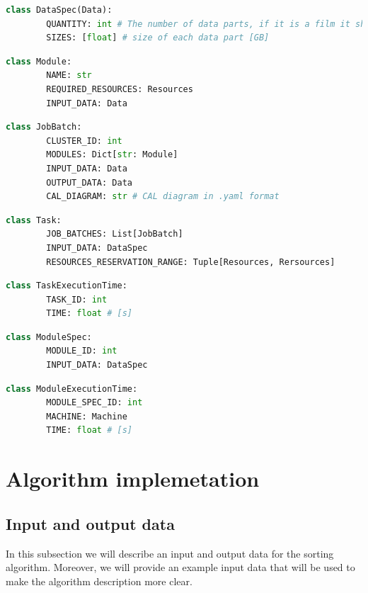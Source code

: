 \documentclass{article}
\begin{document}
	\begin{lstlisting}[language=Python]
	class DataSpec(Data):
		QUANTITY: int # The number of data parts, if it is a film it should be 1, if it is a set of photos, it should be the number of photos
		SIZES: [float] # size of each data part [GB]
	\end{lstlisting}
	
	\begin{lstlisting}[language=Python,label={lst:Module}, caption=Module data structure]
	class Module:
		NAME: str
		REQUIRED_RESOURCES: Resources
		INPUT_DATA: Data
	\end{lstlisting}
	
	\begin{lstlisting}[language=Python]
	class JobBatch:
		CLUSTER_ID: int
		MODULES: Dict[str: Module]
		INPUT_DATA: Data
		OUTPUT_DATA: Data
		CAL_DIAGRAM: str # CAL diagram in .yaml format
	\end{lstlisting}
	
	\begin{lstlisting}[language=Python]
	class Task:
		JOB_BATCHES: List[JobBatch]
		INPUT_DATA: DataSpec
		RESOURCES_RESERVATION_RANGE: Tuple[Resources, Rersources]
	\end{lstlisting}
	
	\begin{lstlisting}[language=Python,label={lst:TaskExecution}, caption=TaskExecution data structure]
	class TaskExecutionTime:
		TASK_ID: int
		TIME: float # [s]
	\end{lstlisting}
	
	\begin{lstlisting}[language=Python,label={lst:ModuleSpec}, caption=ModuleSpec data structure]
	class ModuleSpec:
		MODULE_ID: int
		INPUT_DATA: DataSpec
	\end{lstlisting}
	
	\begin{lstlisting}[language=Python,label={lst:ModuleExecutionTime}, caption=ModuleExecutionTime data structure]
	class ModuleExecutionTime:
		MODULE_SPEC_ID: int
		MACHINE: Machine
		TIME: float # [s]
	\end{lstlisting}
	
	\section{Algorithm implemetation}
	\subsection{Input and output data}
	In this subsection we will describe an input and output data for the sorting algorithm. Moreover, we will provide an example input data that will be used to make the algorithm description more clear. 
	
\end{document}
